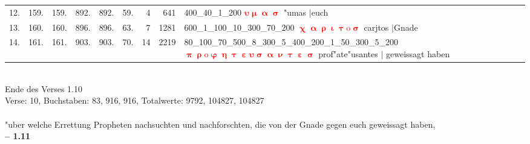 \documentclass[a4paper,10pt,landscape]{article}
\begin{document}
\begin{tabular}{rrrrrrrrp{120mm}}
12.&159.&159.&892.&892.&59.&4&641&400\_40\_1\_200 \textcolor{red}{$\boldsymbol{\upsilon\upmu\upalpha\upsigma}$} "umas $|$euch\\
13.&160.&160.&896.&896.&63.&7&1281&600\_1\_100\_10\_300\_70\_200 \textcolor{red}{$\boldsymbol{\upchi\upalpha\uprho\upiota\uptau\mathrm{o}\upsigma}$} carjtos $|$Gnade\\
14.&161.&161.&903.&903.&70.&14&2219&80\_100\_70\_500\_8\_300\_5\_400\_200\_1\_50\_300\_5\_200 \textcolor{red}{$\boldsymbol{\uppi\uprho\mathrm{o}\upvarphi\upeta\uptau\upepsilon\upsilon\upsigma\upalpha\upnu\uptau\upepsilon\upsigma}$} prof"ate"usantes $|$ geweissagt haben\\
\end{tabular}\medskip \\
Ende des Verses 1.10\\
Verse: 10, Buchstaben: 83, 916, 916, Totalwerte: 9792, 104827, 104827\\
\\
"uber welche Errettung Propheten nachsuchten und nachforschten, die von der Gnade gegen euch geweissagt haben,\\
\newpage 
{\bf -- 1.11}\\
\medskip \\
\end{document}
